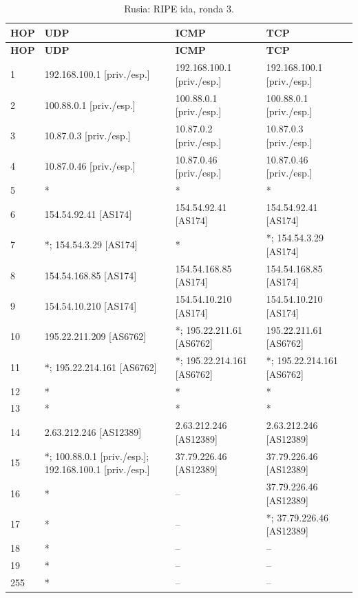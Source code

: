 \endgroup
\begingroup
\fontsize{9}{11}\selectfont
\begin{longtable}{p{0.95cm}p{4.716666666666667cm}p{4.716666666666667cm}p{4.716666666666667cm}}
\caption{Rusia: RIPE ida, ronda 3.}\label{anexo:ripe:37.79.226.46:3} \\
\toprule
\textbf{HOP} & \textbf{UDP} & \textbf{ICMP} & \textbf{TCP} \\ \midrule
\endfirsthead
\toprule
\textbf{HOP} & \textbf{UDP} & \textbf{ICMP} & \textbf{TCP} \\ \midrule
\endhead
1 & 192.168.100.1 [priv./esp.] & 192.168.100.1 [priv./esp.] & 192.168.100.1 [priv./esp.] \\
2 & 100.88.0.1 [priv./esp.] & 100.88.0.1 [priv./esp.] & 100.88.0.1 [priv./esp.] \\
3 & 10.87.0.3 [priv./esp.] & 10.87.0.2 [priv./esp.] & 10.87.0.3 [priv./esp.] \\
4 & 10.87.0.46 [priv./esp.] & 10.87.0.46 [priv./esp.] & 10.87.0.46 [priv./esp.] \\
5 & * & * & * \\
6 & 154.54.92.41 [AS174] & 154.54.92.41 [AS174] & 154.54.92.41 [AS174] \\
7 & *; 154.54.3.29 [AS174] & * & *; 154.54.3.29 [AS174] \\
8 & 154.54.168.85 [AS174] & 154.54.168.85 [AS174] & 154.54.168.85 [AS174] \\
9 & 154.54.10.210 [AS174] & 154.54.10.210 [AS174] & 154.54.10.210 [AS174] \\
10 & 195.22.211.209 [AS6762] & *; 195.22.211.61 [AS6762] & 195.22.211.61 [AS6762] \\
11 & *; 195.22.214.161 [AS6762] & *; 195.22.214.161 [AS6762] & *; 195.22.214.161 [AS6762] \\
12 & * & * & * \\
13 & * & * & * \\
14 & 2.63.212.246 [AS12389] & 2.63.212.246 [AS12389] & 2.63.212.246 [AS12389] \\
15 & *; 100.88.0.1 [priv./esp.]; 192.168.100.1 [priv./esp.] & 37.79.226.46 [AS12389] & 37.79.226.46 [AS12389] \\
16 & * & -- & 37.79.226.46 [AS12389] \\
17 & * & -- & *; 37.79.226.46 [AS12389] \\
18 & * & -- & -- \\
19 & * & -- & -- \\
255 & * & -- & -- \\
\bottomrule
\end{longtable}
